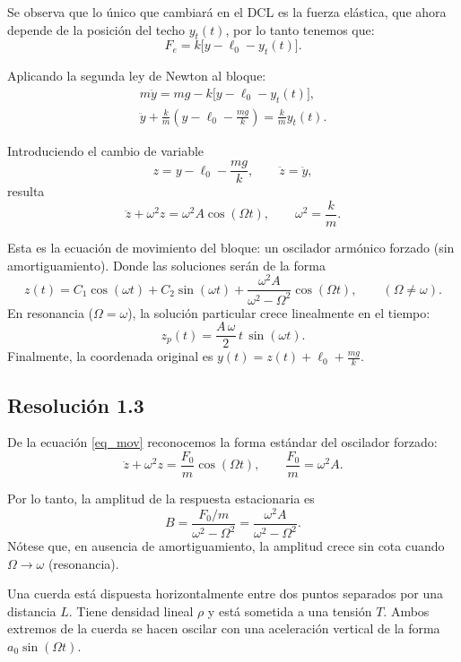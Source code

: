 \documentclass[
  11pt,
  letterpaper,
   addpoints,
   answers
  ]{exam}
\begin{document}
\begin{questions}
\begin{solution}
Se observa que lo único que cambiará en el DCL es la fuerza elástica, que ahora depende de la posición del techo $y_t(t)$, por lo tanto tenemos que:
  \begin{equation}
    F_e = k\big[y - \ell_0 - y_t(t)\big].
  \end{equation}

  Aplicando la segunda ley de Newton al bloque:
  \begin{align}
    m\ddot{y} = mg - k\big[y - \ell_0 - y_t(t)\big], \\
    \ddot{y} + \frac{k}{m}\left(y - \ell_0 - \frac{mg}{k}\right) = \frac{k}{m}y_t(t).
  \end{align}

  Introduciendo el cambio de variable
  \begin{equation}
    z = y - \ell_0 - \frac{mg}{k},
    \qquad \ddot{z} = \ddot{y},
  \end{equation}
  resulta
  \begin{equation}\label{eq_mov}
    \ddot{z} + \omega^2 z = \omega^2 A \cos(\Omega t),
    \qquad \omega^2 = \frac{k}{m}.
  \end{equation}

Esta es la ecuación de movimiento del bloque: un oscilador armónico forzado (sin amortiguamiento). Donde las soluciones serán de la forma
\begin{equation*}
  z(t)=C_1\cos(\omega t)+C_2\sin(\omega t)
       +\frac{\omega^2 A}{\omega^2-\Omega^2}\cos(\Omega t),\qquad (\Omega\ne\omega).
\end{equation*}
En resonancia ($\Omega=\omega$), la solución particular crece linealmente en el tiempo:
\begin{equation*}
  z_p(t)=\frac{A\,\omega}{2}\,t\,\sin(\omega t).
\end{equation*}
Finalmente, la coordenada original es $y(t)=z(t)+\ell_0+\tfrac{mg}{k}$.

  \subsection*{Resolución 1.3}

De la ecuación \eqref{eq_mov} reconocemos la forma estándar del oscilador
  forzado:
  \begin{equation}
    \ddot{z} + \omega^2 z = \frac{F_0}{m}\cos(\Omega t),
    \qquad \frac{F_0}{m} = \omega^2 A.
  \end{equation}

  Por lo tanto, la amplitud de la respuesta estacionaria es
  \begin{equation}
    B = \frac{F_0/m}{\omega^2 - \Omega^2}
      = \frac{\omega^2 A}{\omega^2 - \Omega^2}.
  \end{equation}
  Nótese que, en ausencia de amortiguamiento, la amplitud crece sin cota cuando $\Omega \to \omega$ (resonancia).
\end{solution}
\question Una cuerda está dispuesta horizontalmente entre dos puntos separados por una distancia $L$. Tiene densidad lineal $\rho$ y está sometida a una tensión $T$. Ambos extremos de la cuerda se hacen oscilar con una aceleración vertical de la forma $a_0\sin(\Omega t)$.


\end{questions}
\end{document}
